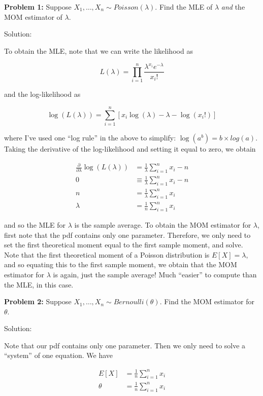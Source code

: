 \documentclass[
  letterpaper,
  DIV=11,
  numbers=noendperiod]{scrreprt}
\begin{document}
\textbf{Problem 1:} Suppose \(X_1, \dots, X_n \sim Poisson(\lambda)\).
Find the MLE of \(\lambda\) \emph{and} the MOM estimator of \(\lambda\).

Solution:

To obtain the MLE, note that we can write the likelihood as

\[
L(\lambda) = \prod_{i = 1}^n \frac{\lambda^{x_i} e^{-\lambda}}{x_i!}
\]

and the log-likelihood as

\[
\log(L(\lambda)) = \sum_{i = 1}^n \left[ x_i\log(\lambda) - \lambda - \log(x_i!)\right]
\]

where I've used one ``log rule'' in the above to simplify:
\(\log(a^b) = b \times log(a)\). Taking the derivative of the
log-likelihood and setting it equal to zero, we obtain

\begin{align*}
  \frac{\partial}{\partial \lambda} \log(L(\lambda)) & = \frac{1}{\lambda} \sum_{i = 1}^n x_i - n \\
  0 & \equiv \frac{1}{\lambda} \sum_{i = 1}^n x_i - n \\
  n & = \frac{1}{\lambda} \sum_{i = 1}^n x_i \\
  \lambda & = \frac{1}{n} \sum_{i = 1}^n x_i
\end{align*}

and so the MLE for \(\lambda\) is the sample average. To obtain the MOM
estimator for \(\lambda\), first note that the pdf contains only one
parameter. Therefore, we only need to set the first theoretical moment
equal to the first sample moment, and solve. Note that the first
theoretical moment of a Poisson distribution is \(E[X] = \lambda\), and
so equating this to the first sample moment, we obtain that the MOM
estimator for \(\lambda\) is again, just the sample average! Much
``easier'' to compute than the MLE, in this case.

\textbf{Problem 2:} Suppose \(X_1, \dots, X_n \sim Bernoulli(\theta)\).
Find the MOM estimator for \(\theta\).

Solution:

Note that our pdf contains only one parameter. Then we only need to
solve a ``system'' of one equation. We have

\begin{align*}
  E[X] & = \frac{1}{n} \sum_{i = 1}^n x_i \\
  \theta & = \frac{1}{n} \sum_{i = 1}^n x_i
\end{align*}
\end{document}
